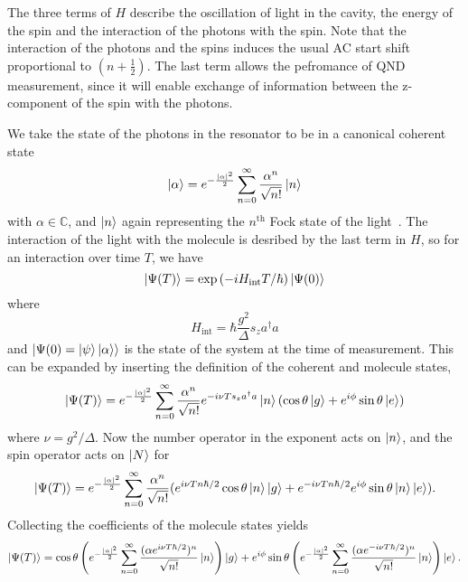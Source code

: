 The three terms of $H$ describe the oscillation of light in the cavity, the energy
of the spin and the interaction of the photons with the spin. Note that the
interaction of the photons and the spins induces the usual AC start shift
proportional to $(n+\frac{1}{2})$. The last term allows the pefromance of 
QND measurement, since it will enable exchange of information
between the z-component of the spin with the photons.

We take the state of the photons in the resonator to be in a canonical coherent
state~\cite{Gazeau2009}
%
\begin{equation}
  \ket{\alpha} = e^{-\frac{|\alpha|^2}{2}}\sum_{n=0}^\infty \frac{\alpha^n}{\sqrt{n!}} \ket{n}
\end{equation}
%
with $\alpha\in\mathbb{C}$, and $\ket{n}$ again representing the $n^\text{th}$
Fock state of the light~\cite{agarwal2012}. The interaction of the light with
the molecule is desribed by the last term in $H$, so for an interaction over
time $T$, we have
%
\begin{equation}
  \ket{\Psi(T)} = \exp\left(-iH_\text{int}T/\hbar\right)\ket{\Psi(0)}
\end{equation}
%
where
%
\begin{equation}
  H_\text{int} = \hbar \frac{g^2}{\Delta} s_z a^\dagger a
\end{equation}
%
and $\ket{\Psi(0) = \ket{\psi}\ket{\alpha}}$ is the state of the system at the
time of measurement. This can be expanded by inserting the definition of the
coherent and molecule states,
%
\begin{equation}
  \ket{\Psi(T)} = e^{-\frac{|\alpha|^2}{2}}\sum_{n=0}^\infty
   \frac{\alpha^n}{\sqrt{n!}} e^{-i\nu T s_z a^\dagger a} \ket{n} (\cos\theta
   \ket{g} + e^{i\phi}\sin\theta\ket{e})
\end{equation}
%
where $\nu = g^2/\Delta$.
Now the number operator in the exponent acts on $\ket{n}$, and the spin
operator acts on $\ket{N}$ for
%
\begin{equation}
   \ket{\Psi(T)} = e^{-\frac{|\alpha|^2}{2}}\sum_{n=0}^\infty
   \frac{\alpha^n}{\sqrt{n!}} (e^{i\nu T n \hbar/2}\cos\theta\ket{n}\ket{g} +
   e^{-i\nu T n \hbar/2}e^{i\phi}\sin\theta\ket{n}\ket{e}).
\end{equation}
%
Collecting the coefficients of the molecule states yields
%
\begin{equation}
  \ket{\Psi(T)} = \cos\theta\left(e^{-\frac{|\alpha|^2}{2}}\sum_{n=0}^\infty
   \frac{(\alpha e^{i\nu T \hbar/2})^n}{\sqrt{n!}}\ket{n}\right)\ket{g} +  
    e^{i\phi}\sin\theta\left(e^{-\frac{|\alpha|^2}{2}}\sum_{n=0}^\infty
   \frac{(\alpha e^{-i\nu T \hbar/2})^n}{\sqrt{n!}}\ket{n}\right)\ket{e}.
\end{equation}
